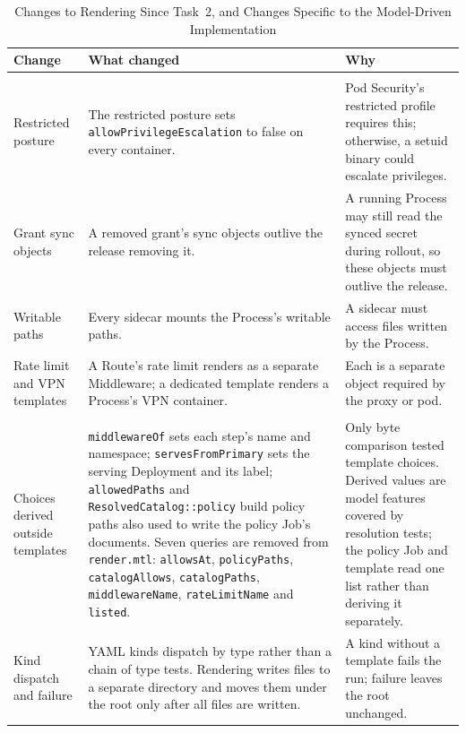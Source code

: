 \begin{table}[!htbp]
\centering
\footnotesize
\begin{tabular}{>{\raggedright\arraybackslash}p{}>{\raggedright\arraybackslash}p{}>{\raggedright\arraybackslash}p{}}
\hline
\textbf{Change} & \textbf{What changed} & \textbf{Why} \\
\hline
\multicolumn{3}{l}{\textit{Rendering}} \\
Restricted posture & The restricted posture sets \texttt{allowPrivilegeEscalation} to false on every container. & Pod Security's restricted profile requires this; otherwise, a setuid binary could escalate privileges. \\
Grant sync objects & A removed grant's sync objects outlive the release removing it. & A running Process may still read the synced secret during rollout, so these objects must outlive the release. \\
Writable paths & Every sidecar mounts the Process's writable paths. & A sidecar must access files written by the Process. \\
Rate limit and VPN templates & A Route's rate limit renders as a separate Middleware; a dedicated template renders a Process's VPN container. & Each is a separate object required by the proxy or pod. \\
\multicolumn{3}{l}{\textit{Specific to the model-driven implementation}} \\
Choices derived outside templates & \texttt{middlewareOf} sets each step's name and namespace; \texttt{servesFromPrimary} sets the serving Deployment and its label; \texttt{allowedPaths} and \texttt{ResolvedCatalog::policy} build policy paths also used to write the policy Job's documents. Seven queries are removed from \texttt{render.mtl}: \texttt{allowsAt}, \texttt{policyPaths}, \texttt{catalogAllows}, \texttt{catalogPaths}, \texttt{middlewareName}, \texttt{rateLimitName} and \texttt{listed}. & Only byte comparison tested template choices. Derived values are model features covered by resolution tests; the policy Job and template read one list rather than deriving it separately. \\
Kind dispatch and failure & YAML kinds dispatch by type rather than a chain of type tests. Rendering writes files to a separate directory and moves them under the root only after all files are written. & A kind without a template fails the run; failure leaves the root unchanged. \\
\hline
\end{tabular}
\caption{Changes to Rendering Since Task~2, and Changes Specific to the Model-Driven Implementation}
\label{tab:app-transform-3}
\end{table}

